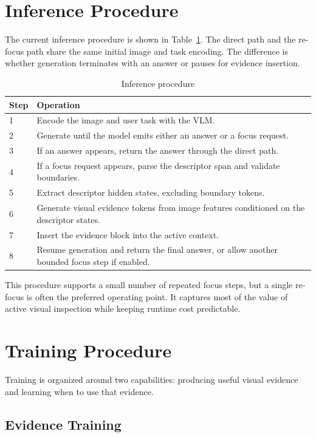 \documentclass[10pt,twocolumn]{article}
\begin{document}
\section{Inference Procedure}

The current inference procedure is shown in Table~\ref{tab:inference}. The direct path and the re-focus path share the same initial image and task encoding. The difference is whether generation terminates with an answer or pauses for evidence insertion.

\begin{table}[t]
\centering
\small
\caption{Inference procedure}
\label{tab:inference}
\begin{tabular}{p{}p{}}
\toprule
Step & Operation \\
\midrule
1 & Encode the image and user task with the VLM. \\
2 & Generate until the model emits either an answer or a focus request. \\
3 & If an answer appears, return the answer through the direct path. \\
4 & If a focus request appears, parse the descriptor span and validate boundaries. \\
5 & Extract descriptor hidden states, excluding boundary tokens. \\
6 & Generate visual evidence tokens from image features conditioned on the descriptor states. \\
7 & Insert the evidence block into the active context. \\
8 & Resume generation and return the final answer, or allow another bounded focus step if enabled. \\
\bottomrule
\end{tabular}
\end{table}

This procedure supports a small number of repeated focus steps, but a single re-focus is often the preferred operating point. It captures most of the value of active visual inspection while keeping runtime cost predictable.

\section{Training Procedure}

Training is organized around two capabilities: producing useful visual evidence and learning when to use that evidence.

\subsection{Evidence Training}
\end{document}
